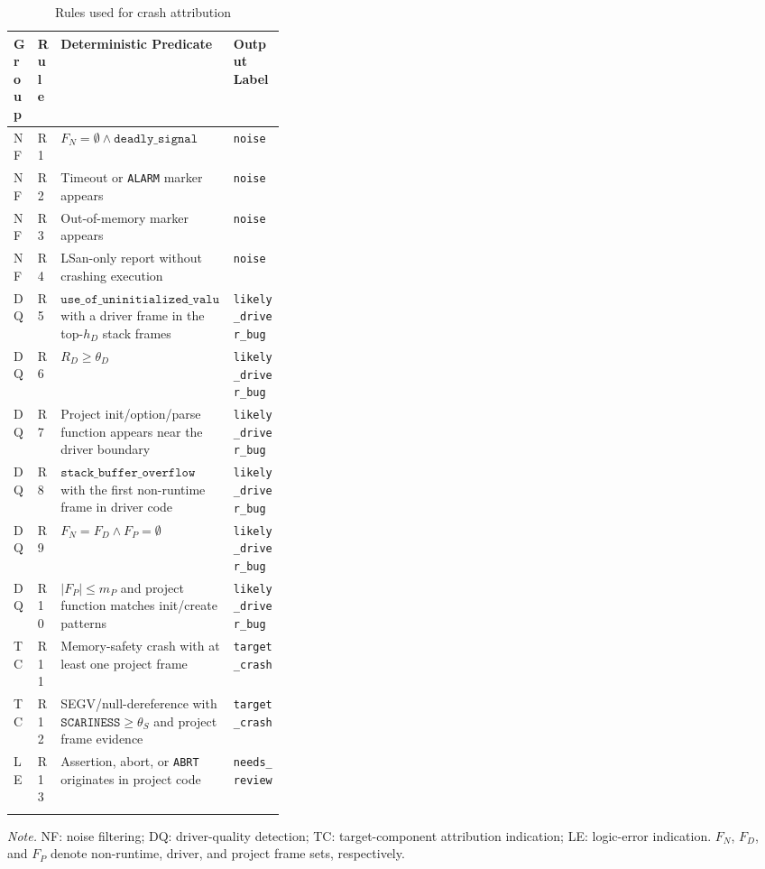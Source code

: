 \documentclass[pdflatex,sn-basic]{sn-jnl}%
\renewcommand{\arraystretch}{1.16}%
\newcommand{\compacttable}{\scriptsize\setlength{\tabcolsep}{2.2pt}\renewcommand{\arraystretch}{1.12}}%
\theoremstyle{thmstyleone}%
\theoremstyle{thmstyletwo}%
\theoremstyle{thmstylethree}%
\begin{document}
\begin{table}[t]
\caption{Rules used for crash attribution}
\label{tab:triage-rule-groups}
\centering
\compacttable
\setlength{\tabcolsep}{2.4pt}
\renewcommand{\arraystretch}{1.10}
\begin{tabularx}{\linewidth}{C{0.08\linewidth} C{0.08\linewidth} Y L{0.19\linewidth}}
\toprule
Group & Rule & Deterministic Predicate & Output Label \\
\midrule
NF & R1 & \(F_N=\emptyset \land \texttt{deadly\_signal}\) & \texttt{noise} \\
NF & R2 & Timeout or \texttt{ALARM} marker appears & \texttt{noise} \\
NF & R3 & Out-of-memory marker appears & \texttt{noise} \\
NF & R4 & LSan-only report without crashing execution & \texttt{noise} \\
\midrule
DQ & R5 & \(\texttt{use\_of\_uninitialized\_value}\) with a driver frame in the top-\(h_D\) stack frames & \texttt{likely\_driver\_bug} \\
DQ & R6 & \(R_D\ge \theta_D\) & \texttt{likely\_driver\_bug} \\
DQ & R7 & Project init/option/parse function appears near the driver boundary & \texttt{likely\_driver\_bug} \\
DQ & R8 & \(\texttt{stack\_buffer\_overflow}\) with the first non-runtime frame in driver code & \texttt{likely\_driver\_bug} \\
DQ & R9 & \(F_N=F_D \land F_P=\emptyset\) & \texttt{likely\_driver\_bug} \\
DQ & R10 & \(|F_P|\le m_P\) and project function matches init/create patterns & \texttt{likely\_driver\_bug} \\
\midrule
TC & R11 & Memory-safety crash with at least one project frame & \texttt{target\_crash} \\
TC & R12 & SEGV/null-dereference with \(\texttt{SCARINESS}\ge \theta_S\) and project frame evidence & \texttt{target\_crash} \\
\midrule
LE & R13 & Assertion, abort, or \texttt{ABRT} originates in project code & \texttt{needs\_review} \\
\botrule
\end{tabularx}
\vspace{2pt}
{\raggedright\scriptsize \textit{Note.} NF: noise filtering; DQ: driver-quality detection; TC: target-component attribution indication; LE: logic-error indication. \(F_N\), \(F_D\), and \(F_P\) denote non-runtime, driver, and project frame sets, respectively.\par}
\end{table}
\end{document}
